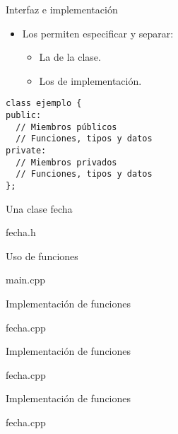 \begin{frame}[t,fragile]{Interfaz e implementación}
\begin{itemize}
  \item Los  permiten especificar y separar:
    \begin{itemize}
      \item La  de la clase.
      \item Los  de implementación.
    \end{itemize}
\end{itemize}
\begin{lstlisting}
class ejemplo {
public:
  // Miembros públicos
  // Funciones, tipos y datos
private:
  // Miembros privados
  // Funciones, tipos y datos
};
\end{lstlisting}
\end{frame}

\begin{frame}[t]{Una clase fecha}
\begin{block}{fecha.h}

\end{block}
\end{frame}

\begin{frame}[t]{Uso de funciones}
\begin{block}{main.cpp}

\end{block}
\end{frame}

\begin{frame}[t]{Implementación de funciones}
\begin{block}{fecha.cpp}

\end{block}
\end{frame}

\begin{frame}[t]{Implementación de funciones}
\begin{block}{fecha.cpp}

\end{block}
\end{frame}

\begin{frame}[t]{Implementación de funciones}
\begin{block}{fecha.cpp}

\end{block}
\end{frame}


